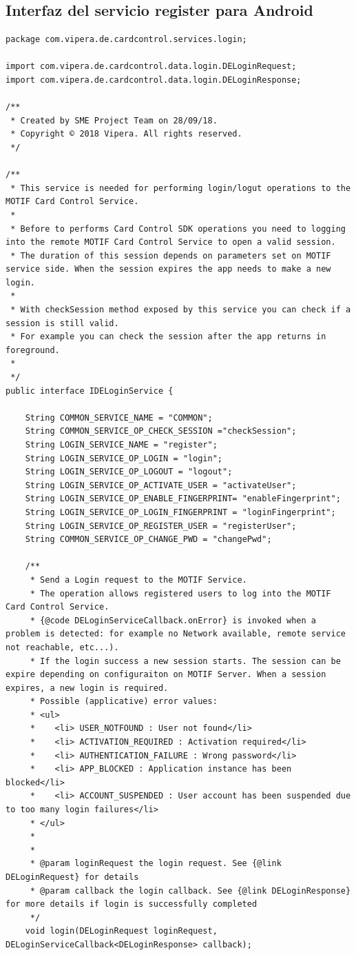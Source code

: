 \documentclass[a4paper, 12pt]{article}
\newenvironment{code}{\captionsetup{type=listing}}{}
\begin{document}
\subsection{Interfaz del servicio register para Android}
\label{sec-6-2}
\begin{code}
\label{code:android-interface-complete}
\begin{verbatim}
package com.vipera.de.cardcontrol.services.login;

import com.vipera.de.cardcontrol.data.login.DELoginRequest;
import com.vipera.de.cardcontrol.data.login.DELoginResponse;

/**
 * Created by SME Project Team on 28/09/18.
 * Copyright © 2018 Vipera. All rights reserved.
 */

/**
 * This service is needed for performing login/logut operations to the MOTIF Card Control Service.
 *
 * Before to performs Card Control SDK operations you need to logging into the remote MOTIF Card Control Service to open a valid session.
 * The duration of this session depends on parameters set on MOTIF service side. When the session expires the app needs to make a new login.
 *
 * With checkSession method exposed by this service you can check if a session is still valid.
 * For example you can check the session after the app returns in foreground.
 *
 */
public interface IDELoginService {

    String COMMON_SERVICE_NAME = "COMMON";
    String COMMON_SERVICE_OP_CHECK_SESSION ="checkSession";
    String LOGIN_SERVICE_NAME = "register";
    String LOGIN_SERVICE_OP_LOGIN = "login";
    String LOGIN_SERVICE_OP_LOGOUT = "logout";
    String LOGIN_SERVICE_OP_ACTIVATE_USER = "activateUser";
    String LOGIN_SERVICE_OP_ENABLE_FINGERPRINT= "enableFingerprint";
    String LOGIN_SERVICE_OP_LOGIN_FINGERPRINT = "loginFingerprint";
    String LOGIN_SERVICE_OP_REGISTER_USER = "registerUser";
    String COMMON_SERVICE_OP_CHANGE_PWD = "changePwd";

    /**
     * Send a Login request to the MOTIF Service.
     * The operation allows registered users to log into the MOTIF Card Control Service.
     * {@code DELoginServiceCallback.onError} is invoked when a problem is detected: for example no Network available, remote service not reachable, etc...).
     * If the login success a new session starts. The session can be expire depending on configuraiton on MOTIF Server. When a session expires, a new login is required.
     * Possible (applicative) error values:
     * <ul>
     *    <li> USER_NOTFOUND : User not found</li>
     *    <li> ACTIVATION_REQUIRED : Activation required</li>
     *    <li> AUTHENTICATION_FAILURE : Wrong password</li>
     *    <li> APP_BLOCKED : Application instance has been blocked</li>
     *    <li> ACCOUNT_SUSPENDED : User account has been suspended due to too many login failures</li>
     * </ul>
     *
     *
     * @param loginRequest the login request. See {@link DELoginRequest} for details
     * @param callback the login callback. See {@link DELoginResponse} for more details if login is successfully completed
     */
    void login(DELoginRequest loginRequest, DELoginServiceCallback<DELoginResponse> callback);



\end{verbatim}
\end{code}
\end{document}

